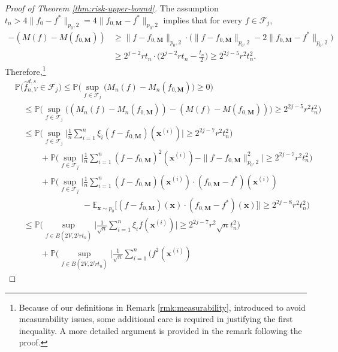 \documentclass[10pt]{article}
\newcommand{\E}{{\mathbb E}}
\newcommand{\F}{{\mathcal{F}}}
\renewcommand{\P}{{\mathbb P}}
\newcommand{\lsefstinf}{{\hat{f}^{d, s}_{n, V}}}
\newcommand{\xbf}{{\mathbf{x}}}
\newcommand{\Mbf}{{\mathbf{M}}}
\begin{document}
\begin{proof}[Proof of Theorem \ref{thm:risk-upper-bound}]
The assumption $t_n > 4 \|f_0 - f^*\|_{p_0, 2} 
= 4 \|f_{0, \Mbf} - f^*\|_{p_0, 2}$ implies that for every $f \in \F_j$,
\begin{equation*}
\begin{aligned}
    -(M(f) - M(f_{0, \Mbf})) 
    &\ge \|f - f_{0, \Mbf}\|_{p_0, 2} \cdot 
    \big(\|f - f_{0, \Mbf}\|_{p_0, 2} - 2 \|f_{0, \Mbf} - f^*\|_{p_0, 2}\big) \\ 
    &\ge 2^{j - 2} r t_n \cdot 
    \Big(2^{j - 2} r t_n - \frac{t_n}{2}\Big) 
    \ge 2^{2j - 5} r^2 t_n^2.
\end{aligned}
\end{equation*}
Therefore,\footnote{Because of our definitions in Remark \ref{rmk:measurability},
introduced to avoid measurability issues, some additional care is required in 
justifying the first inequality. A more detailed argument is provided in 
the remark following the proof.}
\begin{align}\label{eq:peeling-bound}
    &\P\big(\lsefstinf \in \F_j\big) 
    \le
    \P\Big(\sup_{f \in \F_j} \big(M_n(f) - M_n(f_{0, \Mbf})\big) \ge 0 \Big) \nonumber \\
    &\quad\le 
    \P\Big(\sup_{f \in \F_j} \big((M_n(f) - M_n(f_{0, \Mbf})) 
    - (M(f) - M(f_{0, \Mbf}))\big) \ge 2^{2j - 5} r^2 t_n^2 \Big) \nonumber \\
    &\quad\le \P\Big(\sup_{f \in \F_j} \Big|\frac{1}{n} 
    \sum_{i = 1}^{n} \xi_i (f - f_{0, \Mbf})(\xbf^{(i)})\Big| 
    \ge 2^{2j - 7} r^2 t_n^2 \Big) \nonumber \\
    &\quad \qquad + \P\Big(\sup_{f \in \F_j} \Big|\frac{1}{n} 
    \sum_{i = 1}^{n} (f - f_{0, \Mbf})^2(\xbf^{(i)}) 
    -\|f - f_{0, \Mbf}\|_{p_0, 2}^2\Big| \ge 2^{2j - 7} r^2 t_n^2 \Big) \nonumber \\
    &\quad \qquad + \P\Big(\sup_{f \in \F_j} \Big|\frac{1}{n} 
    \sum_{i = 1}^{n} (f - f_{0, \Mbf})(\xbf^{(i)})
    \cdot (f_{0, \Mbf} - f^*)(\xbf^{(i)}) \nonumber \\
    &\quad \qquad \qquad \qquad \quad
    - \E_{\xbf \sim p_0} \big[(f - f_{0, \Mbf})(\xbf) \cdot
    (f_{0, \Mbf} - f^*)(\xbf)\big]\Big|
    \ge 2^{2j - 8} r^2 t_n^2 \Big) \nonumber \\
    &\quad \le \P\Big(\sup_{f \in B(2V, 2^j r t_n)} \Big|\frac{1}{\sqrt{n}} 
    \sum_{i = 1}^{n} \xi_i f(\xbf^{(i)})\Big| 
    \ge 2^{2j - 7} r^2 \sqrt{n}t_n^2 \Big) \nonumber \\
    &\quad \qquad + \P\Big(\sup_{f \in B(2V, 2^j r t_n)} 
    \Big|\frac{1}{\sqrt{n}} \sum_{i = 1}^{n} \big( f^2(\xbf^{(i)}) 

\end{align}
\end{proof}
\end{document}
